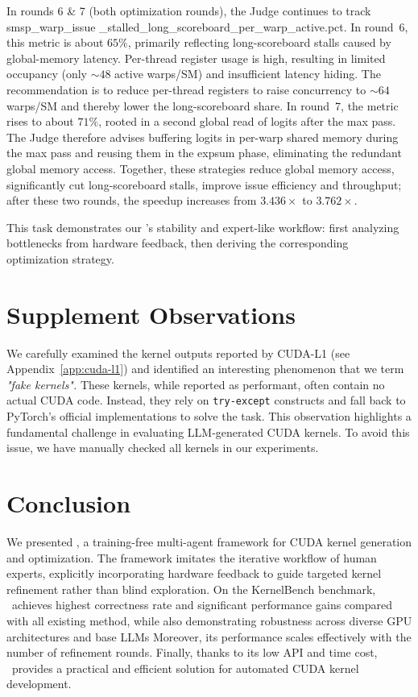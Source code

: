In rounds 6 \& 7 (both optimization rounds), the Judge continues to track smsp\_warp\_issue \_stalled\_long\_scoreboard\_per\_warp\_active.pct. 
In round~6, this metric is about \(65\%\), primarily reflecting long-scoreboard stalls caused by global-memory latency. Per-thread register usage is high, resulting in limited occupancy (only \(\sim48\) active warps/SM) and insufficient latency hiding. 
The recommendation is to reduce per-thread registers to raise concurrency to \(\sim64\) warps/SM and thereby lower the long-scoreboard share. 
In round~7, the metric rises to about \(71\%\), rooted in a second global read of logits after the max pass. 
The Judge therefore advises buffering logits in per-warp shared memory during the max pass and reusing them in the exp\/sum phase, eliminating the redundant global memory access. 
Together, these strategies reduce global memory access, significantly cut long-scoreboard stalls, improve issue efficiency and throughput; after these two rounds, the speedup increases from \(3.436\times\) to \(3.762\times\).

This task demonstrates our \agentname's stability and expert-like workflow: first analyzing bottlenecks from hardware feedback, then deriving the corresponding optimization strategy.

\section{Supplement Observations}

 We carefully examined the kernel outputs reported by CUDA-L1 (see Appendix~\ref{app:cuda-l1}) and identified an interesting phenomenon that we term \emph{"fake kernels".}
These kernels, while reported as performant, often contain no actual CUDA code. Instead, they rely on \texttt{try-except} constructs and fall back to PyTorch’s official implementations to solve the task.
This observation highlights a fundamental challenge in evaluating LLM-generated CUDA kernels. To avoid this issue, we have manually checked all kernels in our experiments.


\section{Conclusion}
We presented \agentname, a training-free multi-agent framework for CUDA kernel generation and optimization.
The framework imitates the iterative workflow of human experts, explicitly incorporating hardware feedback to guide targeted kernel refinement rather than blind exploration. On the KernelBench benchmark, \agentname~achieves highest correctness rate and significant performance gains compared with all existing method, while also demonstrating robustness across diverse GPU architectures and base LLMs 
Moreover, its performance scales effectively with the number of refinement rounds.
Finally, thanks to its low API and time cost, \agentname~provides a practical and efficient solution for automated CUDA kernel development.

\newpage